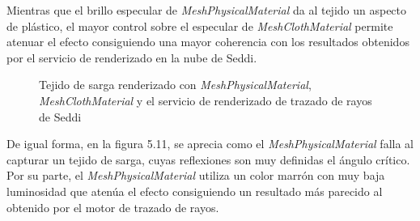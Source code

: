 Mientras que el brillo especular de \textit{MeshPhysicalMaterial} da al tejido un aspecto de pl\'astico, el mayor control sobre
el especular de \textit{MeshClothMaterial} permite atenuar el efecto consiguiendo una mayor coherencia con los resultados obtenidos
por el servicio de renderizado en la nube de Seddi.

\begin{figure}[H]
  \vspace{0.5cm}
  \centering
    \caption{Tejido de sarga renderizado con \textit{MeshPhysicalMaterial}, \textit{MeshClothMaterial} y el servicio de renderizado de trazado de rayos de Seddi}
\end{figure}

De igual forma, en la figura 5.11, se aprecia como el \textit{MeshPhysicalMaterial} falla al capturar un tejido de sarga, cuyas reflexiones
son muy definidas el \'angulo cr\'itico. Por su parte, el \textit{MeshPhysicalMaterial} utiliza un color marr\'on con
muy baja luminosidad que aten\'ua el efecto consiguiendo un resultado m\'as parecido al obtenido por el motor de trazado de rayos.
